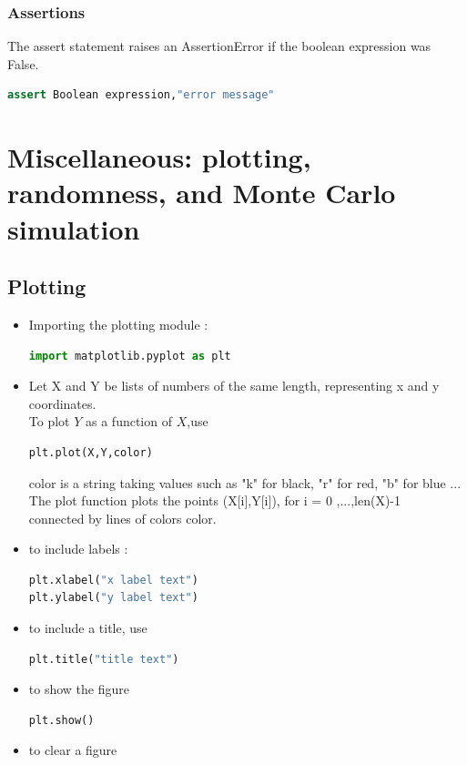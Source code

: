\documentclass[12pt,oneside]{book}
\begin{document}
\subsection{Assertions}
The assert statement raises an AssertionError if the boolean expression was False.
{\small\begin{lstlisting}[language=python]
assert Boolean expression,"error message" 
\end{lstlisting}}
\chapter{Miscellaneous: plotting, randomness, and Monte Carlo simulation }
\section{Plotting}
\begin{itemize}
	\item Importing the plotting module :
\begin{lstlisting}[language=python]
import matplotlib.pyplot as plt
\end{lstlisting}
	\item Let X and Y be lists of numbers of the same length, representing x and y coordinates. \\
	      To plot $Y$ as a function of $X$,use
\begin{lstlisting}[language=python]
plt.plot(X,Y,color)
\end{lstlisting}
	      color is a string taking values such as "k" for black, "r" for red, "b" for blue ...\\
	      The plot function plots the points (X[i],Y[i]), for i = 0 ,...,len(X)-1\\
	      connected by lines of colors color.
	\item to include labels :
\begin{lstlisting}[language=python]
plt.xlabel("x label text")
plt.ylabel("y label text")
\end{lstlisting}
	\item to include a title, use
\begin{lstlisting}[language=python]
plt.title("title text")
\end{lstlisting}
	\item to show the figure
\begin{lstlisting}[language=python]
plt.show()
\end{lstlisting}
	\item to clear a figure
\begin{lstlisting}[language=python]

\end{lstlisting}
\end{itemize}
\end{document}
